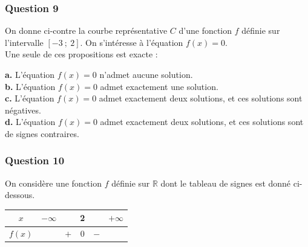 \documentclass[10pt]{article}
\begin{document}
\begin{minipage}[t]{0.6\textwidth}
\subsubsection*{Question 9}
On donne ci-contre la courbe représentative $C$ d'une fonction $f$ définie sur l'intervalle $[-3~;~2]$. On s'intéresse à l'équation $f(x) = 0$. \\
Une seule de ces propositions est exacte :

\textbf{a.} L'équation $f(x) = 0$ n'admet aucune solution. \\
\textbf{b.} L'équation $f(x) = 0$ admet exactement une solution. \\
\textbf{c.} L'équation $f(x) = 0$ admet exactement deux solutions, et ces solutions sont négatives. \\
\textbf{d.} L'équation $f(x) = 0$ admet exactement deux solutions, et ces solutions sont de signes contraires.
\end{minipage}
\hfill
\begin{minipage}[t]{0.35\textwidth}
\vspace{0pt}
\end{minipage}

\subsubsection*{Question 10}
On considère une fonction $f$ définie sur $\mathbb{R}$ dont le tableau de signes est donné ci-dessous.

\begin{center}
\begin{tabular}{|c|ccccc|}
\hline
$x$ & $-\infty$ & & 2 & & $+\infty$ \\
\hline
$f(x)$ & & $+$ & 0 & $-$ & \\
\hline
\end{tabular}
\end{center}
\end{document}
